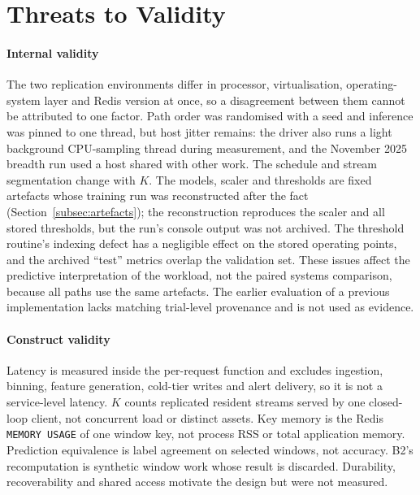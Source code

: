 \documentclass[a4paper,fleqn]{cas-dc}
\begin{document}
\section{Threats to Validity}
\label{sec:threats}
\paragraph{Internal validity} The two replication environments differ in processor, virtualisation, operating-system layer and Redis version at once, so a disagreement between them cannot be attributed to one factor. Path order was randomised with a seed and inference was pinned to one thread, but host jitter remains: the driver also runs a light background CPU-sampling thread during measurement, and the November 2025 breadth run used a host shared with other work. The schedule and stream segmentation change with $K$. The models, scaler and thresholds are fixed artefacts whose training run was reconstructed after the fact (Section~\ref{subsec:artefacts}); the reconstruction reproduces the scaler and all stored thresholds, but the run's console output was not archived. The threshold routine's indexing defect has a negligible effect on the stored operating points, and the archived ``test'' metrics overlap the validation set. These issues affect the predictive interpretation of the workload, not the paired systems comparison, because all paths use the same artefacts. The earlier evaluation of a previous implementation lacks matching trial-level provenance and is not used as evidence.

\paragraph{Construct validity} Latency is measured inside the per-request function and excludes ingestion, binning, feature generation, cold-tier writes and alert delivery, so it is not a service-level latency. $K$ counts replicated resident streams served by one closed-loop client, not concurrent load or distinct assets. Key memory is the Redis \texttt{MEMORY USAGE} of one window key, not process RSS or total application memory. Prediction equivalence is label agreement on selected windows, not accuracy. B2's recomputation is synthetic window work whose result is discarded. Durability, recoverability and shared access motivate the design but were not measured.
\end{document}
